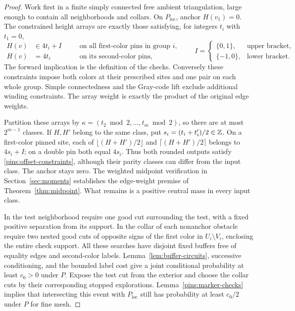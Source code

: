 \begin{proof}
Work first in a finite simply connected free ambient triangulation,
large enough to contain all neighborhoods and collars.  On
$P_{\mathrm{loc}}$, anchor $H(v_1)=0$.  The constrained height arrays
are exactly those satisfying, for integers $t_i$ with $t_1=0$,
\begin{equation}\label{pins:offset-constraints}
 \begin{aligned}
 H(v)&\in4t_i+I\quad &&\text{on all first-color pins in group }i,\\
 H(v)&=4t_i&&\text{on its second-color pins},
 \end{aligned}
 \qquad
 I=\begin{cases}\{0,1\},&\text{upper bracket},\\
                  \{-1,0\},&\text{lower bracket}.
    \end{cases}
\end{equation}
The forward implication is the definition of the checks.  Conversely
these constraints impose both colors at their prescribed sites and one
pair on each whole group.  Simple connectedness and the Gray-code lift
exclude additional winding constraints.  The array weight is exactly
the product of the original edge weights.

Partition these arrays by
$\kappa=(t_2\bmod2,\ldots,t_m\bmod2)$, so there are at most
$2^{m-1}$ classes.  If $H,H'$ belong to the same class, put
$s_i=(t_i+t_i')/2\in\mathbb Z$.  On a first-color pinned site, each of
$\lfloor(H+H')/2\rfloor$ and $\lceil(H+H')/2\rceil$ belongs to
$4s_i+I$; on a double pin both equal $4s_i$.  Thus both rounded
outputs satisfy \eqref{pins:offset-constraints}, although their parity
classes can differ from the input class.  The anchor stays zero.
The weighted midpoint verification in Section~\ref{sec:moments}
establishes the edge-weight premise of Theorem~\ref{thm:midpoint}.  What
remains is a positive central mass in every input class.

In the test neighborhood require one good cut surrounding the test,
with a fixed positive separation from its support.  In the collar of
each nonanchor obstacle require two nested good cuts of opposite signs
of the first color in $U_i\setminus V_i$, enclosing the entire check support.
All these searches have disjoint fixed buffers free of
equality edges and second-color labels.  Lemma~\ref{lem:buffer-circuits},
successive conditioning, and the bounded label cost give a joint
conditional probability at least $c_0>0$ under $P$.  Expose the test
cut from the exterior and choose the collar cuts by their corresponding
stopped explorations.  Lemma~\ref{pins:marker-checks} implies that
intersecting this event with $P_{\mathrm{loc}}$ still has probability
at least $c_0/2$ under $P$ for fine mesh.


\end{proof}

